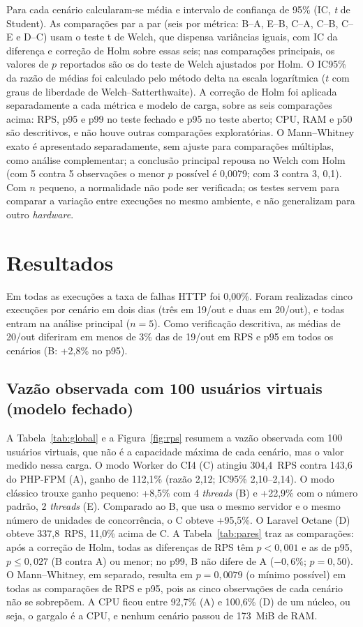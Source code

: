 \documentclass[sigconf, nonacm, screen, language=portuguese, language=spanish, language={main=english}]{acmart}
\begin{document}
Para cada cenário calcularam-se média e intervalo de confiança de 95\% (IC, \textit{t} de Student). As comparações par a par (seis por métrica: B--A, E--B, C--A, C--B, C--E e D--C) usam o teste t de Welch, que dispensa variâncias iguais, com IC da diferença e correção de Holm sobre essas seis; nas comparações principais, os valores de $p$ reportados são os do teste de Welch ajustados por Holm. O IC95\% da razão de médias foi calculado pelo método delta na escala logarítmica ($t$ com graus de liberdade de Welch--Satterthwaite). A correção de Holm foi aplicada separadamente a cada métrica e modelo de carga, sobre as seis comparações acima: RPS, p95 e p99 no teste fechado e p95 no teste aberto; CPU, RAM e p50 são descritivos, e não houve outras comparações exploratórias. O Mann--Whitney exato é apresentado separadamente, sem ajuste para comparações múltiplas, como análise complementar; a conclusão principal repousa no Welch com Holm (com 5 contra 5 observações o menor $p$ possível é 0,0079; com 3 contra 3, 0,1). Com $n$ pequeno, a normalidade não pode ser verificada; os testes servem para comparar a variação entre execuções no mesmo ambiente, e não generalizam para outro \textit{hardware}.

\section{Resultados}
Em todas as execuções a taxa de falhas HTTP foi 0,00\%. Foram realizadas cinco execuções por cenário em dois dias (três em 19/out e duas em 20/out), e todas entram na análise principal ($n=5$). Como verificação descritiva, as médias de 20/out diferiram em menos de 3\% das de 19/out em RPS e p95 em todos os cenários (B: +2,8\% no p95).

\subsection{Vazão observada com 100 usuários virtuais (modelo fechado)}
A Tabela~\ref{tab:global} e a Figura~\ref{fig:rps} resumem a vazão observada com 100 usuários virtuais, que não é a capacidade máxima de cada cenário, mas o valor medido nessa carga. O modo Worker do CI4 (C) atingiu 304,4~RPS contra 143,6 do PHP-FPM (A), ganho de 112,1\% (razão 2,12; IC95\% 2,10--2,14). O modo clássico trouxe ganho pequeno: +8,5\% com 4 \textit{threads} (B) e +22,9\% com o número padrão, 2 \textit{threads} (E). Comparado ao B, que usa o mesmo servidor e o mesmo número de unidades de concorrência, o C obteve +95,5\%. O Laravel Octane (D) obteve 337,8~RPS, 11,0\% acima de C. A Tabela~\ref{tab:pares} traz as comparações: após a correção de Holm, todas as diferenças de RPS têm $p<0{,}001$ e as de p95, $p\le0{,}027$ (B contra A) ou menor; no p99, B não difere de A ($-0{,}6\%$; $p=0{,}50$). O Mann--Whitney, em separado, resulta em $p=0{,}0079$ (o mínimo possível) em todas as comparações de RPS e p95, pois as cinco observações de cada cenário não se sobrepõem. A CPU ficou entre 92,7\% (A) e 100,6\% (D) de um núcleo, ou seja, o gargalo é a CPU, e nenhum cenário passou de 173~MiB de RAM.
\end{document}
